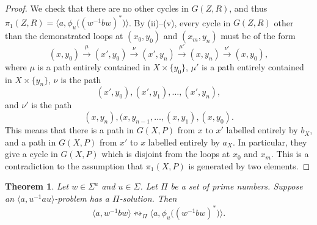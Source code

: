 \documentclass[11pt]{amsart}
\newtheorem{theorem}{Theorem}[section]
\theoremstyle{definition}
\theoremstyle{definition}
\numberwithin{equation}{section}
\begin{document}
\begin{proof}
We check that there are no other cycles in $G(Z, R)$, and thus $\pi_1(Z, R)=\big\langle a, \phi_u\big((w^{-1}bw)^*\big)\big\rangle$. By (ii)--(v), every cycle in $G(Z, R)$ other than the demonstrated loops at $(x_0, y_0)$ and $(x_m, y_n)$ must be of the form 
$$ (x, y_0)\stackrel{\mu}{\longrightarrow}(x',y_0)\stackrel{\nu}{\longrightarrow}(x', y_n)\stackrel{\mu'}{\longrightarrow}(x, y_n)\stackrel{\nu'}{\longrightarrow}(x, y_0), $$
where $\mu$ is a path entirely contained in $X\times\{y_0\}$, $\mu'$ is a path entirely contained in $X\times \{y_n\}$, $\nu$ is the path 
$$ (x', y_0), (x', y_1), \dots, (x', y_n), $$
and $\nu'$ is the path
$$ (x, y_n), (x, y_{n-1}, \dots, (x, y_1), (x, y_0). $$
This means that there is a path in $G(X,P)$ from $x$ to $x'$ labelled entirely by $b_X$, and a path in $G(X,P)$ from $x'$ to $x$ labelled entirely by $a_X$. In particular, they give a cycle in $G(X,P)$ which is disjoint from the loops at $x_0$ and $x_m$. This is a contradiction to the assumption that $\pi_1(X, P)$ is generated by two elements.
\end{proof}


\begin{theorem}\label{thm:stationary} Let $w\in \Sigma^a$ and $u\in \Sigma$. Let $\Pi$ be a set of prime numbers. Suppose an $\langle a, u^{-1}au\rangle$-problem has a $\Pi$-solution. Then
$$\langle a, w^{-1}bw\rangle \leftrightsquigarrow_{\Pi} \big\langle a, \phi_u\big((w^{-1}bw)^*\big)\big\rangle.$$
\end{theorem}
\end{document}
